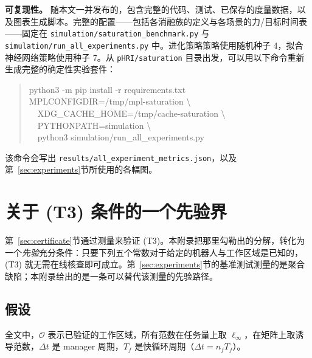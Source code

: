\documentclass[journal]{IEEEtran}
\begin{document}
\textbf{可复现性。} 随本文一并发布的，包含完整的代码、测试、已保存的度量数据，以及图表生成脚本。完整的配置——包括各消融族的定义与各场景的力/目标时间表——固定在 \texttt{simulation/saturation\_benchmark.py} 与 \texttt{simulation/run\_all\_experiments.py} 中。进化策略策略使用随机种子 4，拟合神经网络策略使用种子 7。从 \texttt{pHRI/saturation} 目录出发，可以用以下命令重新生成完整的确定性实验套件：
\begin{quote}
\scriptsize\ttfamily
python3 -m pip install -r requirements.txt\\
MPLCONFIGDIR=/tmp/mpl-saturation \textbackslash\\
\ \ XDG\_CACHE\_HOME=/tmp/cache-saturation \textbackslash\\
\ \ PYTHONPATH=simulation \textbackslash\\
\ \ python3 simulation/run\_all\_experiments.py
\end{quote}
该命令会写出 \texttt{results/all\_experiment\_metrics.json}，以及第~\ref{sec:experiments}节所使用的各幅图。

\balance

\section{关于 (T3) 条件的一个先验界}
\label{app:t3bound}

第~\ref{sec:certificate}节通过测量来验证 (T3)。本附录把那里勾勒出的分解，转化为一个\emph{先验}充分条件：只要下列五个常数对于给定的机器人与工作区域是已知的，(T3) 就无需在线核查即可成立。第~\ref{sec:experiments}节的基准测试测量的是聚合缺陷；本附录给出的是一条可以替代该测量的先验路径。

\subsection{假设}

全文中，$\mathcal O$ 表示已验证的工作区域，所有范数在任务量上取 $\ell_\infty$，在矩阵上取诱导范数，$\Delta t$ 是 manager 周期，$T_f$ 是快循环周期（$\Delta t=n_fT_f$）。
\end{document}
